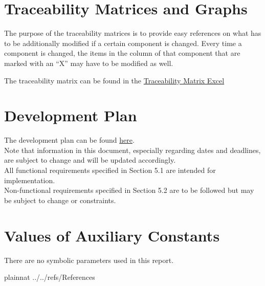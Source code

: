 \documentclass[12pt]{article}
\begin{document}
\newpage

\section{Traceability Matrices and Graphs}

The purpose of the traceability matrices is to provide easy references on what
has to be additionally modified if a certain component is changed.  Every time a
component is changed, the items in the column of that component that are marked
with an ``X'' may have to be modified as well. 

\noindent The traceability matrix can be found in the \href{https://mcmasteru365-my.sharepoint.com/:x:/g/personal/tanj60_mcmaster_ca/EVmV936-L7lFpizmWMpbCZ0B7IRruSZ9ILMjRPHTNvibsg?e=RIsgaI}{Traceability Matrix Excel}

\newpage

\section{Development Plan}

The development plan can be found \href{https://github.com/PlutosCapstone/Plutos/blob/main/docs/DevelopmentPlan/DevelopmentPlan.pdf}{here}. \\

\noindent Note that information in this document, especially regarding dates and deadlines, are subject to change and will be updated accordingly. \\

\noindent All functional requirements specified in Section 5.1 are intended for implementation. \\

\noindent Non-functional requirements specified in Section 5.2 are to be followed but may be subject to change or constraints. \\

\section{Values of Auxiliary Constants}

There are no symbolic parameters used in this report.

\newpage

 {plainnat}
 {../../refs/References}

\newpage

\noindent {}
\end{document}
